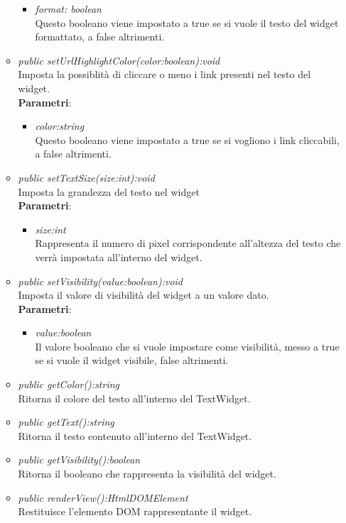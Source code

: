 \begin{itemize}
\begin{itemize}
\begin{itemize}
		\item \textit{format: boolean}\\
		Questo booleano viene impostato a true se si vuole il testo del widget formattato, a false altrimenti.
		\end{itemize} 
	\item \textit{public setUrlHighlightColor(color:boolean):void}\\
	Imposta la possiblità di cliccare o meno i link presenti nel testo del widget.
		\\ \textbf{Parametri}: \begin{itemize}
		\item \textit{color:string}\\
		Questo booleano viene impostato a true se si vogliono i link cliccabili, a false altrimenti.
		\end{itemize} 
	\item \textit{public setTextSize(size:int):void}\\
	Imposta la grandezza del testo nel widget
		\\ \textbf{Parametri}: \begin{itemize}
		\item \textit{size:int}\\
		Rappresenta il numero di pixel corrispondente all'altezza del testo che verrà impostata all'interno del widget.
		\end{itemize} 
		\item \textit{public setVisibility(value:boolean):void}\\
	Imposta il valore di visibilità del widget a un valore dato.
			\\ \textbf{Parametri}: \begin{itemize}
			\item \textit{value:boolean}\\
			Il valore booleano che si vuole impostare come visibilità, messo a true se si vuole il widget visibile, false altrimenti.
	\end{itemize}
	\item \textit{public getColor():string}\\
	Ritorna il colore del testo all'interno del TextWidget.
	\item \textit{public getText():string}\\
	Ritorna il testo contenuto all'interno del TextWidget.
	\item \textit{public getVisibility():boolean}\\
	Ritorna il booleano che rappresenta la visibilità del widget.
	\item \textit{public renderView():HtmlDOMElement}\\
	Restituisce l'elemento DOM rappresentante il widget.
	\end{itemize}
\end{itemize}

